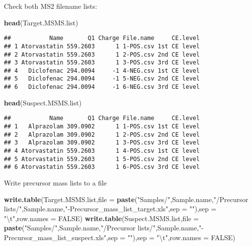 \documentclass[]{article}
\newenvironment{Shaded}{\begin{snugshade}}{\end{snugshade}}
\newcommand{\KeywordTok}[1]{\textcolor[rgb]{0.13,0.29,0.53}{\textbf{#1}}}
\newcommand{\DataTypeTok}[1]{\textcolor[rgb]{0.13,0.29,0.53}{#1}}
\newcommand{\CharTok}[1]{\textcolor[rgb]{0.31,0.60,0.02}{#1}}
\newcommand{\StringTok}[1]{\textcolor[rgb]{0.31,0.60,0.02}{#1}}
\newcommand{\OtherTok}[1]{\textcolor[rgb]{0.56,0.35,0.01}{#1}}
\newcommand{\NormalTok}[1]{#1}
\begin{document}
Check both MS2 filename lists:

\begin{Shaded}
\begin{Highlighting}[]
\KeywordTok{head}\NormalTok{(Target.MSMS.list)}
\end{Highlighting}
\end{Shaded}

\begin{verbatim}
##           Name       Q1 Charge File.name     CE.level
## 1 Atorvastatin 559.2603      1 1-POS.csv 1st CE level
## 2 Atorvastatin 559.2603      1 2-POS.csv 2nd CE level
## 3 Atorvastatin 559.2603      1 3-POS.csv 3rd CE level
## 4   Diclofenac 294.0094     -1 4-NEG.csv 1st CE level
## 5   Diclofenac 294.0094     -1 5-NEG.csv 2nd CE level
## 6   Diclofenac 294.0094     -1 6-NEG.csv 3rd CE level
\end{verbatim}

\begin{Shaded}
\begin{Highlighting}[]
\KeywordTok{head}\NormalTok{(Suspect.MSMS.list)}
\end{Highlighting}
\end{Shaded}

\begin{verbatim}
##           Name       Q1 Charge File.name     CE.level
## 1   Alprazolam 309.0902      1 1-POS.csv 1st CE level
## 2   Alprazolam 309.0902      1 2-POS.csv 2nd CE level
## 3   Alprazolam 309.0902      1 3-POS.csv 3rd CE level
## 4 Atorvastatin 559.2603      1 4-POS.csv 1st CE level
## 5 Atorvastatin 559.2603      1 5-POS.csv 2nd CE level
## 6 Atorvastatin 559.2603      1 6-POS.csv 3rd CE level
\end{verbatim}

Write precursor mass lists to a file

\begin{Shaded}
\begin{Highlighting}[]
\KeywordTok{write.table}\NormalTok{(Target.MSMS.list,}\DataTypeTok{file =} \KeywordTok{paste}\NormalTok{(}\StringTok{"Samples/"}\NormalTok{,Sample.name,}\StringTok{"/Precursor lists/"}\NormalTok{,Sample.name,}\StringTok{"-Precursor_mass_list_target.xls"}\NormalTok{,}\DataTypeTok{sep =} \StringTok{""}\NormalTok{),}\DataTypeTok{sep =} \StringTok{"}\CharTok{\textbackslash{}t}\StringTok{"}\NormalTok{,}\DataTypeTok{row.names =} \OtherTok{FALSE}\NormalTok{)}
\KeywordTok{write.table}\NormalTok{(Suspect.MSMS.list,}\DataTypeTok{file =} \KeywordTok{paste}\NormalTok{(}\StringTok{"Samples/"}\NormalTok{,Sample.name,}\StringTok{"/Precursor lists/"}\NormalTok{,Sample.name,}\StringTok{"-Precursor_mass_list_suspect.xls"}\NormalTok{,}\DataTypeTok{sep =} \StringTok{""}\NormalTok{),}\DataTypeTok{sep =} \StringTok{"}\CharTok{\textbackslash{}t}\StringTok{"}\NormalTok{,}\DataTypeTok{row.names =} \OtherTok{FALSE}\NormalTok{)}
\end{Highlighting}
\end{Shaded}
\end{document}
